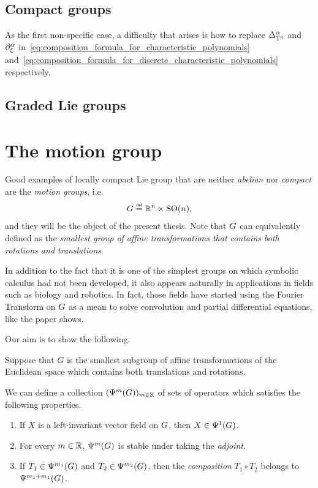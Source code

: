 \subsection{Compact groups}

As the first non-specific case,
a difficulty that arises is how to replace $\DifferenceOperatorOrder [\T^n] \alpha$ and $\iD{\xi^\alpha}$
in~\eqref{eq:composition_formula_for_characteristic_polynomials} and~\eqref{eq:composition_formula_for_discrete_characteristic_polynomials} respectively.

\subsection{Graded Lie groups}

\section{The motion group}

Good examples of locally compact Lie group that are neither \emph{abelian} nor \emph{compact} are the \emph{motion groups}, i.e.
\begin{align*}
    \Group \defeq \R^n \ltimes \SpecialOrthogonalGroup n,
\end{align*}
and they will be the object of the present thesis.
Note that $\Group$ can equivalently defined as the \emph{smallest group of affine transformations that contains both rotations and translations}.

In addition to the fact that it is one of the simplest groups on which symbolic calculus had not been developed,
it also appears naturally in applications in fields such as biology and robotics.
In fact, those fields have started using the Fourier Transform on $\Group$ as a mean to solve convolution and partial differential equations,
like the paper \cite{ChirikjianKyatkin00} shows.

Our aim is to show the following.

\begin{theorem}
    Suppose that $G$ is the smallest subgroup of affine transformations of the Euclidean space
    which contains both translations and rotations.

    We can define a collection $(\OperatorClass m {})_{m \in \R}$
    of sets of operators
    which satisfies the following properties.
    \begin{enumerate}
        \item If $X$ is a left-invariant vector field on $\Group$,
            then $X \in \OperatorClass 1 {}$.
        \item For every $m \in \R$, $\OperatorClass m {}$ is stable under taking the \emph{adjoint}.
        \item If $T_1 \in \OperatorClass {m_1} {}$ and $T_2 \in \OperatorClass {m_2} {}$, then the \emph{composition} $T_1 \circ T_2$ belongs to $\OperatorClass {m_1 + m_1} {}$.
    \end{enumerate}
\end{theorem}
